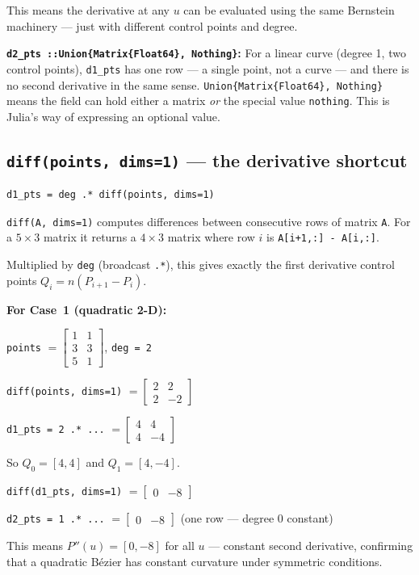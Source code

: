 \documentclass[12pt, a4paper]{article}
\newcommand{\cd}[1]{\texttt{#1}}
\begin{document}
This means the derivative at any $u$ can be evaluated
using the same Bernstein machinery --- just with different
control points and degree.

\textbf{\cd{d2\_pts ::Union\{Matrix\{Float64\}, Nothing\}}:}
For a linear curve (degree 1, two control points),
\cd{d1\_pts} has one row --- a single point, not a
curve --- and there is no second derivative in the
same sense.
\cd{Union\{Matrix\{Float64\}, Nothing\}} means the field
can hold either a matrix \emph{or} the special value
\cd{nothing}.
This is Julia's way of expressing an optional value.

\subsection{\texttt{diff(points, dims=1)} --- the derivative shortcut}

\begin{verbatim}
d1_pts = deg .* diff(points, dims=1)
\end{verbatim}

\cd{diff(A, dims=1)} computes differences between
consecutive rows of matrix \cd{A}.
For a $5\times3$ matrix it returns a $4\times3$ matrix
where row $i$ is \cd{A[i+1,:] - A[i,:]}.

Multiplied by \cd{deg} (broadcast \cd{.*}), this gives
exactly the first derivative control points $Q_i = n(P_{i+1}-P_i)$.

\begin{examplebox}
\textbf{For Case~1 (quadratic 2-D):}

\cd{points} $= \begin{bmatrix}1&1\\3&3\\5&1\end{bmatrix}$, \quad \cd{deg = 2}

\cd{diff(points, dims=1)} $= \begin{bmatrix}2&2\\2&-2\end{bmatrix}$

\cd{d1\_pts = 2 .* ...} $= \begin{bmatrix}4&4\\4&-4\end{bmatrix}$

So $Q_0 = [4, 4]$ and $Q_1 = [4, -4]$.

\medskip
\cd{diff(d1\_pts, dims=1)} $= \begin{bmatrix}0&-8\end{bmatrix}$

\cd{d2\_pts = 1 .* ...} $= \begin{bmatrix}0&-8\end{bmatrix}$
\quad (one row --- degree 0 constant)

This means $P''(u) = [0, -8]$ for all $u$ ---
constant second derivative, confirming that a quadratic
B\'ezier has constant curvature under symmetric conditions.
\end{examplebox}
\end{document}
